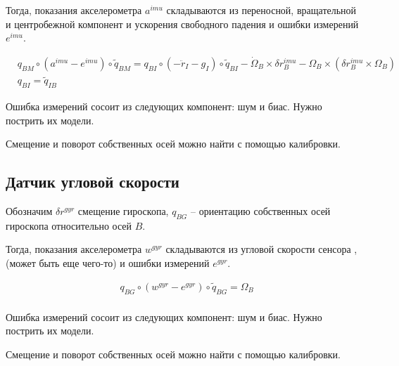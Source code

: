 \documentclass[a4paper,12pt]{article}
\begin{document}
Тогда, показания акселерометра $a^{imu}$ складываются из переносной, вращательной и центробежной компонент и ускорения свободного падения и ошибки измерений $e^{imu}$.

\begin{align*} 
&q_{BM} \circ (a^{imu} - e^{imu}) \circ \tilde{q}_{BM} = 
{q}_{BI} \circ (-\ddot{r}_{I} - g_I) \circ \tilde{q}_{BI}
 - {\dot{\Omega}_B \times \delta r^{imu}_B} - \Omega_B \times (\delta r^{imu}_B \times \Omega_B)
\\
&q_{BI} = \tilde{q}_{IB}
\end{align*}

Ошибка измерений сосоит из следующих компонент: шум и биас. Нужно пострить их модели.

Смещение и поворот собственных осей можно найти с помощью калибровки.

\subsection{Датчик угловой скорости}
Обозначим $\delta r^{\textit{gyr}}$ смещение гироскопа,  $q_{BG}$ -- ориентацию собственных осей гироскопа относительно осей $B$.

Тогда, показания акселерометра $w^{\textit{gyr}}$ складываются из угловой скорости сенсора , (может быть еще чего-то) и ошибки измерений $e^{\textit{gyr}}$.

\begin{align*} 
&q_{BG} \circ (w^{\textit{gyr}} - e^{\textit{gyr}}) \circ \tilde{q}_{BG} = 
\Omega_B
\\
\end{align*}

Ошибка измерений сосоит из следующих компонент: шум и биас. Нужно пострить их модели.

Смещение и поворот собственных осей можно найти с помощью калибровки.
\end{document}
